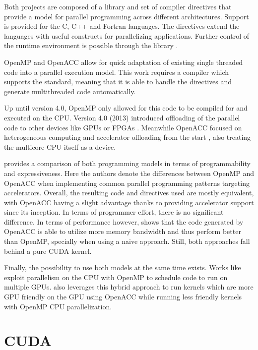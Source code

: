 Both projects are composed of a library and set of compiler directives that provide a model for parallel programming across different architectures. Support is provided for the C, C++ and Fortran languages. The directives extend the languages with useful constructs for parallelizing applications. Further control of the runtime environment is possible through the library \cite{openmp_spec, openacc_spec}.

OpenMP and OpenACC allow for quick adaptation of existing single threaded code into a parallel execution model. This work requires a compiler which supports the standard, meaning that it is able to handle the directives and generate multithreaded code automatically. 

Up until version 4.0, OpenMP only allowed for this code to be compiled for and executed on the CPU. Version 4.0 (2013) introduced offloading of the parallel code to other devices like GPUs or FPGAs \cite{openmp_gpu_support}. Meanwhile OpenACC focused on heterogeneous computing and accelerator offloading from the start \cite{openacc_initial_spec}, also treating the multicore CPU itself as a device.

\cite{openmp_vs_openacc} provides a comparison of both programming models in terms of programmability and expressiveness. Here the authors denote the differences between OpenMP and OpenACC when implementing common parallel programming patterns targeting accelerators. Overall, the resulting code and directives used are mostly equivalent, with OpenACC having a slight advantage thanks to providing accelerator support since its inception. In terms of programmer effort, there is no significant difference. In terms of performance however, \cite{cuda_openacc_openmp_performance} shows that the code generated by OpenACC is able to utilize more memory bandwidth and thus perform better than OpenMP, specially when using a naive approach. Still, both approaches fall behind a pure CUDA kernel.

Finally, the possibility to use both models at the same time exists. Works like \cite{openmp_openacc_multigpus} exploit parallelism on the CPU with OpenMP to schedule code to run on multiple GPUs. \cite{openmp_openacc_molecular_docking} also leverages this hybrid approach to run kernels which are more GPU friendly on the GPU using OpenACC while running less friendly kernels with OpenMP CPU parallelization. 

\section{CUDA}

